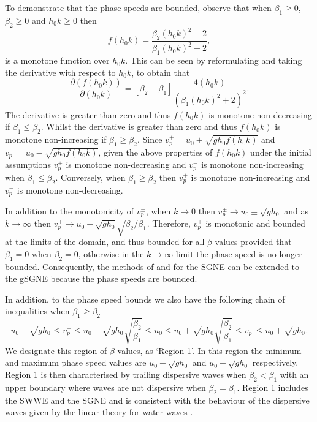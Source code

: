\documentclass[10pt]{elsarticle}
\begin{document}
To demonstrate that the phase speeds are bounded, observe that when $\beta_1 \ge 0$, $\beta_2 \ge 0$ and $h_0 k \ge 0$ then
\begin{equation*}
f(h_0k) = \dfrac{\beta_2 \left(h_0 k\right)^2 + 2}{\beta_1 \left(h_0 k\right)^2 + 2},
\end{equation*}
is a monotone function over $h_0 k$. This can be seen by reformulating and taking the derivative with respect to $h_0 k$, to obtain that 
\begin{equation*}
\dfrac{\partial \left(f(h_0k)\right)}{\partial \left(h_0 k\right)} = \left[\beta_2 - \beta_1\right] \dfrac{4\left(h_0 k\right)}{\left( \beta_1 \left(h_0 k\right)^2 + 2\right)^2}.
\end{equation*}
The derivative is greater than zero and thus $f(h_0k)$ is monotone non-decreasing if $\beta_1 \le \beta_2$. Whilst the derivative is greater than zero and thus $f(h_0k)$ is monotone non-increasing if $\beta_1 \ge  \beta_2$. Since $v^+_p = u_0 + \sqrt{gh_0 f(h_0 k)} $ and $v^-_p = u_0 - \sqrt{gh_0 f(h_0 k)}$, given the above properties of $f(h_0k)$ under the initial assumptions $v^+_p$ is monotone non-decreasing and $v^-_p$ is monotone non-increasing when $\beta_1 \le  \beta_2$. Conversely, when $\beta_1 \ge  \beta_2$ then $v^+_p$ is monotone non-increasing and $v^-_p$ is monotone non-decreasing. 

In addition to the monotonicity of $v^\pm_p$, when $k \rightarrow 0$ then $v^\pm_p \rightarrow u_0 \pm \sqrt{gh_0}$ and as $k \rightarrow \infty$ then $v^\pm_p \rightarrow u_0 \pm \sqrt{gh_0} \sqrt{{\beta_2}/ \beta_1 }$. Therefore, $v^\pm_p$ is monotonic and bounded at the limits of the domain, and thus bounded for all $\beta$ values provided that $\beta_1 = 0$ when $\beta_2 = 0$, otherwise in the $k \rightarrow \infty$ limit the phase speed is no longer bounded. Consequently, the methods of \citet{Hank-etal-2010-2034} and \citet{Zoppou-etal-2017} for the SGNE can be extended to the gSGNE because the phase speeds are bounded.

In addition, to the phase speed bounds we also have the following chain of inequalities when ${\beta_1} \ge \beta_2$ 
\begin{equation}
u_0 -  \sqrt{gh_0} \le  v^-_p \le u_0 - \sqrt{gh_0} \sqrt{\dfrac{\beta_2}{ \beta_1}} \le u_0 \le u_0 + \sqrt{gh_0} \sqrt{\dfrac{\beta_2}{\beta_1}} \le   v^+_p  \le u_0 +   \sqrt{gh_0}.
\label{eq:wavespeedbound1}
\end{equation}
We designate this region of $\beta$ values, as `Region 1'. In this region the minimum and maximum phase speed values are $ u_0 -  \sqrt{gh_0}$ and $u_0 +  \sqrt{gh_0} $ respectively. Region 1 is then characterised by trailing dispersive waves when $\beta_2 <  \beta_1$ with an upper boundary where waves are not dispersive when $\beta_2 =  \beta_1$. Region 1 includes the SWWE and the SGNE and is consistent with the behaviour of the dispersive waves given by the linear theory for water waves \cite{Whitham-1967-399}. 
\end{document}
